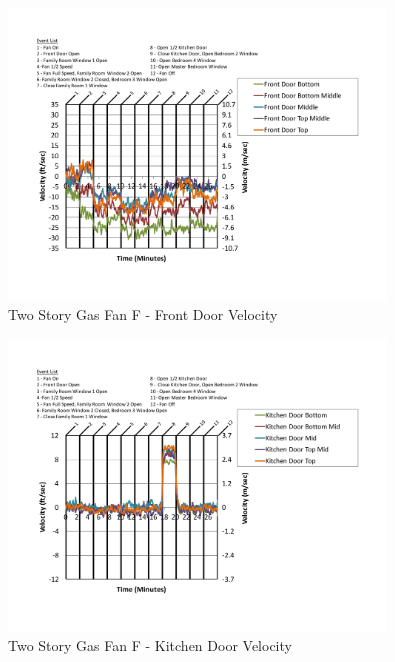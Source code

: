 \documentclass{article}
\begin{document}
\begin{appendices}
	\begin{figure}[H]
		\centering
		\includegraphics[height=3.05in,trim=0.67in 1.1in 0.67in 0.8in,clip=true]{0_Images/Results_Charts/ColdFlow/Two_Story/Gas/F/Front_Door_Velocity.pdf}
		\caption{Two Story Gas Fan F - Front Door Velocity}
	\end{figure}
 

	\begin{figure}[H]
		\centering
		\includegraphics[height=3.05in,trim=0.67in 1.1in 0.67in 0.8in,clip=true]{0_Images/Results_Charts/ColdFlow/Two_Story/Gas/F/Kitchen_Door_Velocity.pdf}
		\caption{Two Story Gas Fan F - Kitchen Door Velocity}
	\end{figure}
 
	\clearpage


\end{appendices}
\end{document}
